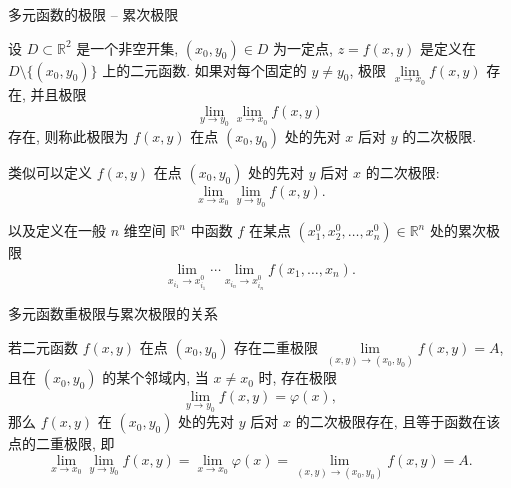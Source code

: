 \begin{frame}{多元函数的极限 -- 累次极限}

\begin{Def}[二次极限]
设 $D \subset \mathbb{R}^2$ 是一个非空开集, $(x_0, y_0) \in D$ 为一定点, $z = f(x, y)$ 是定义在 $D \setminus \{(x_0, y_0)\}$ 上的二元函数.
如果对{\color{red}每个固定的 $y\neq y_0$}, 极限 $\lim\limits_{x \to x_0} f(x, y)$ 存在, 并且极限
\[\lim_{y \to y_0} \lim_{x \to x_0} f(x, y)\]
存在, 则称此极限为 $f(x, y)$ 在点 $(x_0, y_0)$ 处的先对 $x$ 后对 $y$ 的二次极限.
\end{Def}

\pause

类似可以定义 $f(x, y)$ 在点 $(x_0, y_0)$ 处的先对 $y$ 后对 $x$ 的二次极限:
\[\lim_{x \to x_0} \lim_{y \to y_0} f(x, y).\]

\pause
\vspace{0.5em}

以及定义在一般 $n$ 维空间 $\mathbb{R}^n$ 中函数 $f$ 在某点 $(x_1^0, x_2^0, \dots, x_n^0) \in \mathbb{R}^n$ 处的累次极限
\vspace*{-1em}
\[\lim_{x_{i_1} \to x_{i_1}^0} \cdots \lim_{x_{i_n} \to x_{i_n}^0} f(x_1, \dots, x_n).\]

\end{frame}


\begin{frame}{多元函数重极限与累次极限的关系}

\begin{thm}
若二元函数 $f(x, y)$ 在点 $(x_0, y_0)$ 存在二重极限 $\lim\limits_{(x,y) \to (x_0, y_0)} f(x, y) = A$, 且在 $(x_0, y_0)$ 的某个邻域内, 当 $x \neq x_0$ 时, 存在极限
\[\lim_{y \to y_0} f(x, y) = \varphi(x),\]
那么 $f(x, y)$ 在 $(x_0, y_0)$ 处的先对 $y$ 后对 $x$ 的二次极限存在, 且等于函数在该点的二重极限, 即
\[\lim_{x \to x_0} \lim_{y \to y_0} f(x, y) = \lim_{x \to x_0} \varphi(x) = \lim_{(x,y) \to (x_0, y_0)} f(x, y) = A.\]
\end{thm}

\end{frame}


